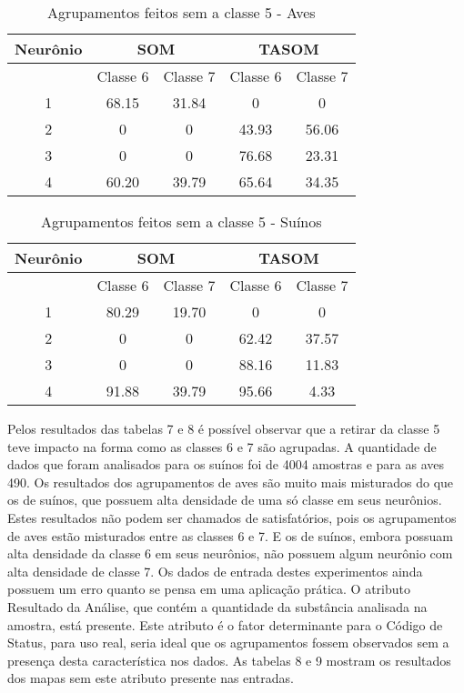 \begin{table}[h]
\centering
\caption{Agrupamentos feitos sem a classe 5 - Aves}
\label{my-label}
\begin{tabular}{|c|c|c|c|c|}
\hline
Neurônio & \multicolumn{2}{c|}{SOM} & \multicolumn{2}{c|}{TASOM} \\ \hline
         & Classe 6    & Classe 7   & Classe 6     & Classe 7    \\ \hline
1        & 68.15       & 31.84      & 0            & 0           \\ \hline
2        & 0           & 0          & 43.93        & 56.06       \\ \hline
3        & 0           & 0          & 76.68        & 23.31       \\ \hline
4        & 60.20       & 39.79      & 65.64        & 34.35       \\ \hline
\end{tabular}
\end{table}

\begin{table}[h]
\centering
\caption{Agrupamentos feitos sem a classe 5 - Suínos}
\label{my-label}
\begin{tabular}{|c|c|c|c|c|}
\hline
Neurônio & \multicolumn{2}{c|}{SOM} & \multicolumn{2}{c|}{TASOM} \\ \hline
         & Classe 6    & Classe 7   & Classe 6     & Classe 7    \\ \hline
1        & 80.29       & 19.70      & 0            & 0           \\ \hline
2        & 0           & 0          & 62.42        & 37.57       \\ \hline
3        & 0           & 0          & 88.16        & 11.83       \\ \hline
4        & 91.88       & 39.79      & 95.66        & 4.33        \\ \hline
\end{tabular}
\end{table}

Pelos resultados das tabelas 7 e 8 é possível observar que a retirar da classe 5 teve impacto na forma como as classes 6 e 7 são agrupadas. A quantidade de dados que foram analisados para os suínos foi de 4004 amostras e para as aves 490. Os resultados dos agrupamentos de aves são muito mais misturados do que os de suínos, que possuem alta densidade de uma só classe em seus neurônios. Estes resultados não podem ser chamados de satisfatórios, pois os agrupamentos de aves estão misturados entre as classes 6 e 7. E os de suínos, embora possuam alta densidade da classe 6 em seus neurônios, não possuem algum neurônio com alta densidade de classe 7. Os dados de entrada destes experimentos ainda possuem um erro quanto se pensa em uma aplicação prática. O atributo Resultado da Análise, que contém a quantidade da substância analisada na amostra, está presente. Este atributo é o fator determinante para o Código de Status, para uso real, seria ideal que os agrupamentos fossem observados sem a presença desta característica nos dados. As tabelas 8 e 9 mostram os resultados dos mapas sem este atributo presente nas entradas. 


